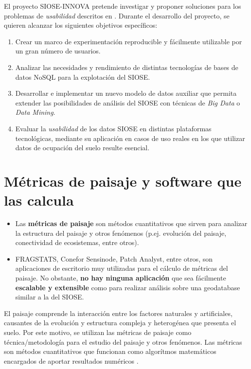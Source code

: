 El proyecto SIOSE-INNOVA pretende investigar y proponer soluciones para los problemas de \textit{usabilidad} descritos en \citet{FernandezVillarino2012}. Durante el desarrollo del proyecto, se quieren alcanzar los siguientes objetivos específicos:
\begin{enumerate}
\item Crear un marco de experimentación reproducible y fácilmente utilizable por un gran número de usuarios.
\item Analizar las necesidades y rendimiento de distintas tecnologías de bases de datos NoSQL para la explotación del SIOSE.
\item Desarrollar e implementar un nuevo modelo de datos auxiliar que permita extender las posibilidades de análisis del SIOSE con técnicas de \textit{Big Data} o \textit{Data Mining}.
\item Evaluar la \textit{usabilidad} de los datos SIOSE en distintas plataformas tecnológicas, mediante su aplicación en casos de uso reales en los que utilizar datos de ocupación del suelo resulte esencial.
\end{enumerate}


\section{Métricas de paisaje y software que las calcula}\label{sec:metrica}

\begin{graybox}
\begin{itemize}
\item Las \textbf{métricas de paisaje} son métodos cuantitativos que sirven para analizar la estructura del paisaje y otros fenómenos (p.ej. evolución del paisaje, conectividad de ecosistemas, entre otros).
\item FRAGSTATS, Conefor Sensinode, Patch Analyst, entre otros, son aplicaciones de escritorio muy utilizadas para el cálculo de métricas del paisaje. No obstante, \textbf{no hay ninguna aplicación} que sea fácilmente \textbf{escalable y extensible} como para realizar análisis sobre una geodatabase similar a la del SIOSE.
\end{itemize}
\end{graybox}

El paisaje comprende la interacción entre los factores naturales y artificiales, causantes de la evolución y estructura compleja y heterogénea que presenta el suelo. Por este motivo, se utilizan las métricas de paisaje como técnica/metodología para el estudio del paisaje y otros fenómenos. Las métricas son métodos cuantitativos que funcionan como algorítmos matemáticos encargados de aportar resultados numéricos \cite{Gine2014}.

